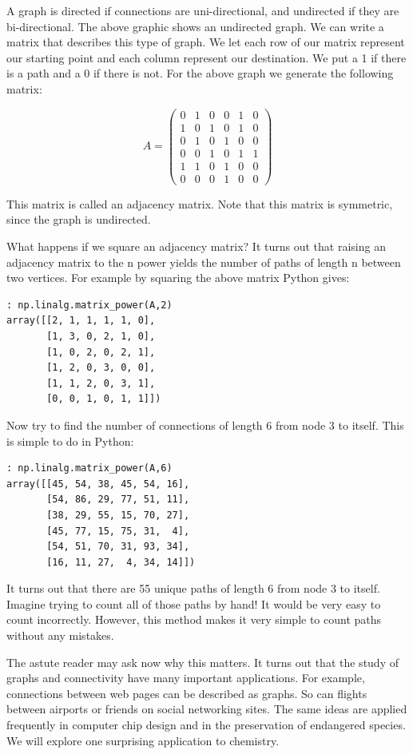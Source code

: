 A graph is directed if connections are uni-directional, and undirected if they are bi-directional. The above graphic shows an undirected graph. We can write a matrix that describes this type of graph. We let each row of our matrix represent our starting point and each column represent our destination. We put a 1 if there is a path and a 0 if there is not. For the above graph we generate the following matrix:

\[
A = \begin{pmatrix}
0 & 1 & 0 & 0 & 1 & 0\\
1 & 0 & 1 & 0 & 1 & 0\\
0 & 1 & 0 & 1 & 0 & 0\\
0 & 0 & 1 & 0 & 1 & 1\\
1 & 1 & 0 & 1 & 0 & 0\\
0 & 0 & 0 & 1 & 0 & 0
\end{pmatrix}
\]

This matrix is called an adjacency matrix. Note that this matrix is symmetric, since the graph is undirected.

What happens if we square an adjacency matrix? It turns out that raising an adjacency matrix to the n power yields the number of paths of length n between two vertices. For example by squaring the above matrix Python gives:
\begin{lstlisting}[style=python]
: np.linalg.matrix_power(A,2)
array([[2, 1, 1, 1, 1, 0],
       [1, 3, 0, 2, 1, 0],
       [1, 0, 2, 0, 2, 1],
       [1, 2, 0, 3, 0, 0],
       [1, 1, 2, 0, 3, 1],
       [0, 0, 1, 0, 1, 1]])
\end{lstlisting}

Now try to find the number of connections of length 6 from node 3 to itself. This is simple to do in Python:
\begin{lstlisting}[style=python]
: np.linalg.matrix_power(A,6)
array([[45, 54, 38, 45, 54, 16],
       [54, 86, 29, 77, 51, 11],
       [38, 29, 55, 15, 70, 27],
       [45, 77, 15, 75, 31,  4],
       [54, 51, 70, 31, 93, 34],
       [16, 11, 27,  4, 34, 14]])
\end{lstlisting}
It turns out that there are 55 unique paths of length 6 from node 3 to itself. Imagine trying to count all of those paths by hand! It would be very easy to count incorrectly. However, this method makes it very simple to count paths without any mistakes.

The astute reader may ask now why this matters. It turns out that the study of graphs and connectivity have many important applications. For example, connections between web pages can be described as graphs. So can flights between airports or friends on social networking sites. The same ideas are applied frequently in computer chip design and in the preservation of endangered species. We will explore one surprising application to chemistry.

